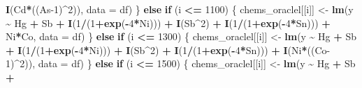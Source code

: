 \documentclass[12pt, twoside]{amherstthesis}
\newenvironment{Shaded}{\begin{snugshade}}{\end{snugshade}}
\newcommand{\AttributeTok}[1]{\textcolor[rgb]{0.13,0.29,0.53}{#1}}
\newcommand{\ControlFlowTok}[1]{\textcolor[rgb]{0.13,0.29,0.53}{\textbf{#1}}}
\newcommand{\DecValTok}[1]{\textcolor[rgb]{0.00,0.00,0.81}{#1}}
\newcommand{\FunctionTok}[1]{\textcolor[rgb]{0.13,0.29,0.53}{\textbf{#1}}}
\newcommand{\NormalTok}[1]{#1}
\newcommand{\OtherTok}[1]{\textcolor[rgb]{0.56,0.35,0.01}{#1}}
\newcommand{\SpecialCharTok}[1]{\textcolor[rgb]{0.81,0.36,0.00}{\textbf{#1}}}
\begin{document}
\begin{Shaded}
\begin{Highlighting}[]
                                \FunctionTok{I}\NormalTok{(Cd}\SpecialCharTok{*}\NormalTok{((As}\DecValTok{{-}1}\NormalTok{)}\SpecialCharTok{\^{}}\DecValTok{2}\NormalTok{)), }\AttributeTok{data =}\NormalTok{ df)}
\NormalTok{    \} }\ControlFlowTok{else} \ControlFlowTok{if}\NormalTok{ (i }\SpecialCharTok{\textless{}=} \DecValTok{1100}\NormalTok{) \{}
\NormalTok{      chems\_oraclel[[i]] }\OtherTok{\textless{}{-}} \FunctionTok{lm}\NormalTok{(y }\SpecialCharTok{\textasciitilde{}}\NormalTok{ Hg }\SpecialCharTok{+}\NormalTok{ Sb }\SpecialCharTok{+}
                                \FunctionTok{I}\NormalTok{(}\DecValTok{1}\SpecialCharTok{/}\NormalTok{(}\DecValTok{1}\SpecialCharTok{+}\FunctionTok{exp}\NormalTok{(}\SpecialCharTok{{-}}\DecValTok{4}\SpecialCharTok{*}\NormalTok{Ni))) }\SpecialCharTok{+} \FunctionTok{I}\NormalTok{(Sb}\SpecialCharTok{\^{}}\DecValTok{2}\NormalTok{) }\SpecialCharTok{+} \FunctionTok{I}\NormalTok{(}\DecValTok{1}\SpecialCharTok{/}\NormalTok{(}\DecValTok{1}\SpecialCharTok{+}\FunctionTok{exp}\NormalTok{(}\SpecialCharTok{{-}}\DecValTok{4}\SpecialCharTok{*}\NormalTok{Sn))) }\SpecialCharTok{+}
\NormalTok{                                Ni}\SpecialCharTok{*}\NormalTok{Co, }\AttributeTok{data =}\NormalTok{ df)}
\NormalTok{    \} }\ControlFlowTok{else} \ControlFlowTok{if}\NormalTok{ (i }\SpecialCharTok{\textless{}=} \DecValTok{1300}\NormalTok{) \{}
\NormalTok{      chems\_oraclel[[i]] }\OtherTok{\textless{}{-}} \FunctionTok{lm}\NormalTok{(y }\SpecialCharTok{\textasciitilde{}}\NormalTok{ Hg }\SpecialCharTok{+}\NormalTok{ Sb }\SpecialCharTok{+}
                                \FunctionTok{I}\NormalTok{(}\DecValTok{1}\SpecialCharTok{/}\NormalTok{(}\DecValTok{1}\SpecialCharTok{+}\FunctionTok{exp}\NormalTok{(}\SpecialCharTok{{-}}\DecValTok{4}\SpecialCharTok{*}\NormalTok{Ni))) }\SpecialCharTok{+} \FunctionTok{I}\NormalTok{(Sb}\SpecialCharTok{\^{}}\DecValTok{2}\NormalTok{) }\SpecialCharTok{+} \FunctionTok{I}\NormalTok{(}\DecValTok{1}\SpecialCharTok{/}\NormalTok{(}\DecValTok{1}\SpecialCharTok{+}\FunctionTok{exp}\NormalTok{(}\SpecialCharTok{{-}}\DecValTok{4}\SpecialCharTok{*}\NormalTok{Sn))) }\SpecialCharTok{+}
                                \FunctionTok{I}\NormalTok{(Ni}\SpecialCharTok{*}\NormalTok{((Co}\DecValTok{{-}1}\NormalTok{)}\SpecialCharTok{\^{}}\DecValTok{2}\NormalTok{)), }\AttributeTok{data =}\NormalTok{ df)}
\NormalTok{    \} }\ControlFlowTok{else} \ControlFlowTok{if}\NormalTok{ (i }\SpecialCharTok{\textless{}=} \DecValTok{1500}\NormalTok{) \{}
\NormalTok{      chems\_oraclel[[i]] }\OtherTok{\textless{}{-}} \FunctionTok{lm}\NormalTok{(y }\SpecialCharTok{\textasciitilde{}}\NormalTok{ Hg }\SpecialCharTok{+}\NormalTok{ Sb }\SpecialCharTok{+}

\end{Highlighting}
\end{Shaded}
\end{document}
